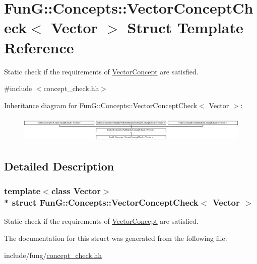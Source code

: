 \hypertarget{structFunG_1_1Concepts_1_1VectorConceptCheck}{}\section{FunG\+:\+:Concepts\+:\+:Vector\+Concept\+Check$<$ Vector $>$ Struct Template Reference}
\label{structFunG_1_1Concepts_1_1VectorConceptCheck}


Static check if the requirements of \hyperlink{structFunG_1_1Concepts_1_1VectorConcept}{Vector\+Concept} are satisfied.  




{\ttfamily \#include $<$concept\+\_\+check.\+hh$>$}

Inheritance diagram for FunG\+:\+:Concepts\+:\+:Vector\+Concept\+Check$<$ Vector $>$\+:\begin{figure}[H]
\begin{center}
\leavevmode
\includegraphics[height=1.287356cm]{structFunG_1_1Concepts_1_1VectorConceptCheck}
\end{center}
\end{figure}


\subsection{Detailed Description}
\subsubsection*{template$<$class Vector$>$\\*
struct Fun\+G\+::\+Concepts\+::\+Vector\+Concept\+Check$<$ Vector $>$}

Static check if the requirements of \hyperlink{structFunG_1_1Concepts_1_1VectorConcept}{Vector\+Concept} are satisfied. 

The documentation for this struct was generated from the following file\+:\begin{DoxyCompactItemize}
\item 
include/fung/\hyperlink{concept__check_8hh}{concept\+\_\+check.\+hh}\end{DoxyCompactItemize}
